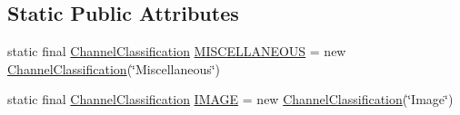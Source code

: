 \subsection*{Static Public Attributes}
\begin{DoxyCompactItemize}
\item 
static final \hyperlink{classgov_1_1fnal_1_1ppd_1_1dd_1_1changer_1_1ChannelClassification}{Channel\-Classification} \hyperlink{classgov_1_1fnal_1_1ppd_1_1dd_1_1changer_1_1ChannelClassification_aff2ea773d09e0647abdcb5642bbbec0b}{M\-I\-S\-C\-E\-L\-L\-A\-N\-E\-O\-U\-S} = new \hyperlink{classgov_1_1fnal_1_1ppd_1_1dd_1_1changer_1_1ChannelClassification}{Channel\-Classification}(\char`\"{}Miscellaneous\char`\"{})
\item 
static final \hyperlink{classgov_1_1fnal_1_1ppd_1_1dd_1_1changer_1_1ChannelClassification}{Channel\-Classification} \hyperlink{classgov_1_1fnal_1_1ppd_1_1dd_1_1changer_1_1ChannelClassification_a368a93f6624e94cdd2a80b67e37d6187}{I\-M\-A\-G\-E} = new \hyperlink{classgov_1_1fnal_1_1ppd_1_1dd_1_1changer_1_1ChannelClassification}{Channel\-Classification}(\char`\"{}Image\char`\"{})
\end{DoxyCompactItemize}


